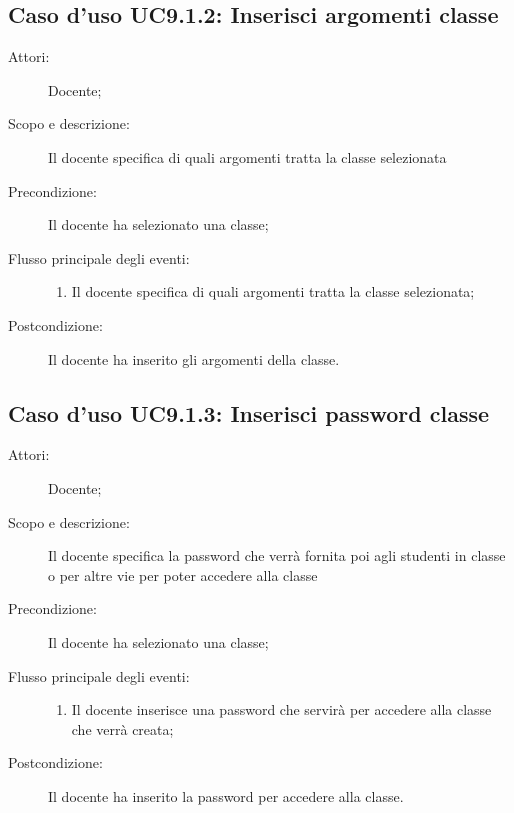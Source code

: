 \subsection{Caso d'uso UC9.1.2: Inserisci argomenti classe}\begin{description}
\item[Attori:] Docente;
\item[Scopo e descrizione:] Il docente specifica di quali argomenti tratta la classe selezionata
      \item[Precondizione:] Il docente ha selezionato una classe;

        \item[Flusso principale degli eventi:] \begin{enumerate}
          \item Il docente specifica di quali argomenti tratta la classe selezionata;

      \end{enumerate}
    \item[Postcondizione:] Il docente ha inserito gli argomenti della classe.
  \end{description}
\hypertarget{UC9.1.3}{}
\subsection{Caso d'uso UC9.1.3: Inserisci password classe}\begin{description}
\item[Attori:] Docente;
\item[Scopo e descrizione:] Il docente specifica la password che verrà fornita poi agli studenti in classe o per altre vie per poter accedere alla classe
      \item[Precondizione:] Il docente ha selezionato una classe;

        \item[Flusso principale degli eventi:] \begin{enumerate}
          \item Il docente inserisce una password che servirà per accedere alla classe che verrà creata;

      \end{enumerate}
    \item[Postcondizione:] Il docente ha inserito la password per accedere alla classe.
  \end{description}
\hypertarget{UC9.2}{}
